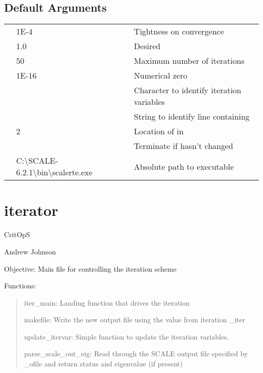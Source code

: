 \documentclass[letterpaper,10pt,english]{sphinxmanual}
\begin{document}
\section{Default Arguments}
\label{\detokenize{external_iteration:default-arguments}}\label{\detokenize{external_iteration:defaults}}
\noindent\begin{tabulary}{\linewidth}{|L|L|L|}
\hline
{}\relax &\relax &\relax \\
\hline
{}
&
1E-4
&
Tightness on  convergence
\\
\hline
{}
&
1.0
&
Desired 
\\
\hline
{}
&
50
&
Maximum number of iterations
\\
\hline
{}
&
1E-16
&
Numerical zero
\\
\hline
{}
&
&
Character to identify iteration variables
\\
\hline
{}
&
&
String to identify line containing 
\\
\hline
{}
&
2
&
Location of  in 
\\
\hline
{}
&
&
Terminate if  hasn't changed
\\
\hline
{}
&
C:\textbackslash{}SCALE-6.2.1\textbackslash{}bin\textbackslash{}scalerte.exe
&
Absolute path to  executable
\\
\hline\end{tabulary}



\chapter{iterator}
\label{\detokenize{iterator::doc}}\label{\detokenize{iterator:iterator}}\label{\detokenize{iterator:module-critops.iterator}}
CritOpS

Andrew Johnson

Objective: Main file for controlling the iteration scheme

Functions:
\begin{quote}

iter\_main: Landing function that drives the iteration

makefile: Write the new output file using the value from iteration 
\_iter

update\_itervar: Simple function to update the iteration variables.

parse\_scale\_out\_eig: Read through the SCALE output file specified by 
\_ofile and return status and eigenvalue (if present)
\end{quote}
\end{document}
